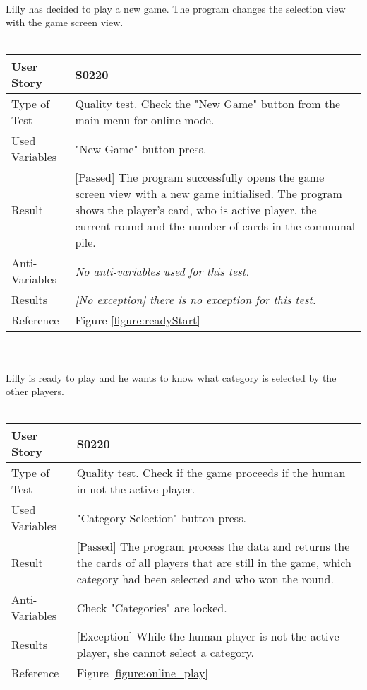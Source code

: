 \vspace{0.2cm}\\
Lilly has decided to play a new game. The program changes the selection view with the game screen view.\\
\vspace{0.2cm}\\  
\begin{tabular}{l | p{12cm}}
User Story & \textbf{S0220}\\ \hline
Type of Test & Quality test. Check the "New Game" button from the main menu for online mode.\\ \hline
Used Variables & "New Game" button press.\\ \hline
Result & [Passed] The program successfully opens the game screen view with a new game initialised. The program shows the player's card, who is active player, the current round and the number of cards in the communal pile.\\ \hline
Anti-Variables & \textit{No anti-variables used for this test.}\\ \hline
Results & \textit{[No exception] there is no exception for this test.}\\ \hline
Reference & Figure \ref{figure:readyStart} \\ \hline
\end{tabular}\\
\vspace{0.2cm}\\  
Lilly is ready to play and he wants to know what category is selected by the other players.\\
\vspace{0.2cm}\\
\begin{tabular}{l | p{12cm}}
User Story & \textbf{S0220}\\ \hline
Type of Test & Quality test. Check if the game proceeds if the human in not the active player.\\ \hline
Used Variables & "Category Selection" button press.\\ \hline
Result & [Passed] The program process the data and returns the the cards of all players that are still in the game, which category had been selected and who won the round.\\ \hline
Anti-Variables & Check "Categories" are locked.\\ \hline
Results & [Exception] While the human player is not the active player, she cannot select a category.\\ \hline
Reference & Figure \ref{figure:online_play} \\ \hline
\end{tabular}\\
